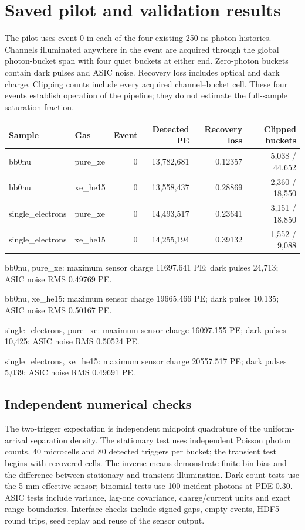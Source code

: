 \section{Saved pilot and validation results}
The pilot uses event 0 in each of the four existing 250 ns photon histories.
Channels illuminated anywhere in the event are acquired through the global
photon-bucket span with four quiet buckets at either end. Zero-photon buckets
contain dark pulses and ASIC noise. Recovery loss includes optical and dark
charge. Clipping counts include every acquired channel--bucket cell.
These four events establish operation of the pipeline; they do not estimate
the full-sample saturation fraction.

\begin{center}\small
\begin{tabular}{llrrrr}\toprule Sample & Gas & Event & Detected PE & Recovery loss & Clipped buckets \\\midrule
bb0nu & pure\_xe & 0 & 13,782,681 & 0.12357 & 5,038 / 44,652 \\
bb0nu & xe\_he15 & 0 & 13,558,437 & 0.28869 & 2,360 / 18,550 \\
single\_electrons & pure\_xe & 0 & 14,493,517 & 0.23641 & 3,151 / 18,850 \\
single\_electrons & xe\_he15 & 0 & 14,255,194 & 0.39132 & 1,552 / 9,088 \\
\bottomrule\end{tabular}
\end{center}

bb0nu, pure\_xe: maximum sensor charge 11697.641 PE; dark pulses 24,713; ASIC noise RMS 0.49769 PE.

bb0nu, xe\_he15: maximum sensor charge 19665.466 PE; dark pulses 10,135; ASIC noise RMS 0.50167 PE.

single\_electrons, pure\_xe: maximum sensor charge 16097.155 PE; dark pulses 10,425; ASIC noise RMS 0.50524 PE.

single\_electrons, xe\_he15: maximum sensor charge 20557.517 PE; dark pulses 5,039; ASIC noise RMS 0.49691 PE.

\subsection{Independent numerical checks}
The two-trigger expectation is independent midpoint quadrature of the
uniform-arrival separation density. The stationary test uses independent
Poisson photon counts, 40 microcells and 80 detected triggers per bucket;
the transient test begins with recovered cells. The inverse means demonstrate
finite-bin bias and the difference between stationary and transient illumination.
Dark-count tests use the 5 mm effective sensor; binomial tests use 100 incident
photons at PDE 0.30. ASIC tests include variance, lag-one covariance, charge/current
units and exact range boundaries. Interface checks include signed gaps, empty
events, HDF5 round trips, seed replay and reuse of the sensor output.

